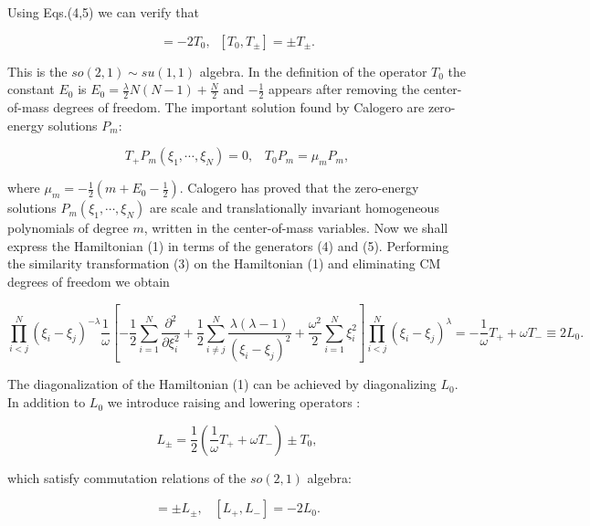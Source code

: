 \documentclass[a4paper,preprint,aps]{revtex4}
\begin{document}
Using Eqs.(4,5) we can verify that


\begin{equation}
	[T_{+},T_{-}]=-2T_{0},\;\; [T_{0},T_{\pm}]=\pm T_{\pm}.
\end{equation}

This is the $so(2,1) \sim su(1,1)$ algebra. In the definition of the operator
 $T_{0}$ the constant $E_{0}$ is $E_{0}=\frac{\lambda}{2}N(N-1)+\frac{N}{2}$
 and $-\frac{1}{2}$ appears after removing the center-of-mass degrees of
 freedom. The important solution found by Calogero are zero-energy solutions
 $P_{m}$:

 
\begin{equation}
	T_{+}P_{m}(\xi_{1},\cdots,\xi_{N})=0,\;\;\;
	T_{0}P_{m}=\mu_{m}P_{m},
\end{equation}

where $\mu_{m}=-\frac{1}{2}\left(m+E_{0}-\frac{1}{2}\right)$. Calogero has
 proved that the zero-energy solutions $P_{m}(\xi_{1},\cdots,\xi_{N})$ are
 scale and translationally invariant homogeneous polynomials of degree $m$,
 written in the center-of-mass variables. Now we shall express the
 Hamiltonian (1) in terms of the generators (4) and (5). Performing the
 similarity transformation (3) on the Hamiltonian (1) and eliminating CM
 degrees of freedom we obtain 


\begin{equation}
	\prod_{i<j}^{N}(\xi_{i}-\xi_{j})^{-\lambda}
	 \frac{1}{\omega}
	\left[
	- \frac{1}{2}
	\sum_{i=1}^{N}
		\frac {\partial ^{2}}{\partial \xi_{i}^2} +
		\frac{1}{2}
	\sum_{i\neq j}^{N}
	 	\frac {\lambda(\lambda-1)}{(\xi_{i}-\xi_{j})^{2}} +
		\frac{\omega^{2}}{2}
	\sum_{i=1}^{N}
		\xi_{i}^2
	\right]
	\prod_{i<j}^{N}(\xi_{i}-\xi_{j})^{\lambda} =
	-\frac{1}{\omega}T_{+} + \omega T_{-} \equiv 2L_{0}. 
\end{equation}


 The diagonalization of the Hamiltonian (1) can be achieved by
 diagonalizing $L_{0}$. In addition to $L_{0}$ we introduce raising and
 lowering operators \cite{AFF}:


\begin{equation}
	L_{\pm}=\frac{1}{2}
	\left(
	\frac{1}{\omega}T_{+}+\omega T_{-}
	\right)
	\pm T_{0},
\end{equation}

which satisfy commutation relations of the $so(2,1)$ algebra:


\begin{equation}
	[L_{0},L_{\pm}]=\pm L_{\pm},\;\;\; [L_{+},L_{-}]=-2L_{0}.
\end{equation}
\end{document}
